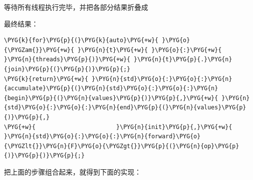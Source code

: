 
等待所有线程执行完毕，并把各部分结果折叠成



最终结果：



\begin{codeblockbg}
\begin{Verbatim}[commandchars=\\\{\},breaklines=true,breakanywhere=true,fontsize=\codefont,xleftmargin=17bp]
\PYG{k}{for}\PYG{p}{(}\PYG{k}{auto}\PYG{+w}{ }\PYG{o}{\PYGZam{}}\PYG{+w}{ }\PYG{n}{t}\PYG{+w}{ }\PYG{o}{:}\PYG{+w}{ }\PYG{n}{threads}\PYG{p}{)}\PYG{+w}{ }\PYG{n}{t}\PYG{p}{.}\PYG{n}{join}\PYG{p}{(}\PYG{p}{)}\PYG{p}{;}
\PYG{k}{return}\PYG{+w}{ }\PYG{n}{std}\PYG{o}{:}\PYG{o}{:}\PYG{n}{accumulate}\PYG{p}{(}\PYG{n}{std}\PYG{o}{:}\PYG{o}{:}\PYG{n}{begin}\PYG{p}{(}\PYG{n}{values}\PYG{p}{)}\PYG{p}{,}\PYG{+w}{ }\PYG{n}{std}\PYG{o}{:}\PYG{o}{:}\PYG{n}{end}\PYG{p}{(}\PYG{n}{values}\PYG{p}{)}\PYG{p}{,}
\PYG{+w}{                       }\PYG{n}{init}\PYG{p}{,}\PYG{+w}{ }\PYG{n}{std}\PYG{o}{:}\PYG{o}{:}\PYG{n}{forward}\PYG{o}{\PYGZlt{}}\PYG{n}{F}\PYG{o}{\PYGZgt{}}\PYG{p}{(}\PYG{n}{op}\PYG{p}{)}\PYG{p}{)}\PYG{p}{;}
\end{Verbatim}
\end{codeblockbg}



把上面的步骤组合起来，就得到下面的实现：



